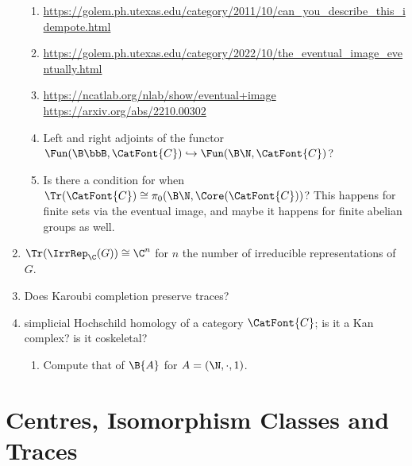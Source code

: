 \begin{enumerate}
\begin{enumerate}
            \item \url{https://golem.ph.utexas.edu/category/2011/10/can_you_describe_this_idempote.html}
            \item \url{https://golem.ph.utexas.edu/category/2022/10/the_eventual_image_eventually.html}
            \item \url{https://ncatlab.org/nlab/show/eventual+image}
                \url{https://arxiv.org/abs/2210.00302}
            \item Left and right adjoints of the functor $\Fun(\B\bbB,\CatFont{C})\hookrightarrow\Fun(\B\N,\CatFont{C})$?
            \item Is there a condition for when $\Tr(\CatFont{C})\cong\pi_{0}(\B\N,\Core(\CatFont{C}))$? This happens for finite sets via the eventual image, and maybe it happens for finite abelian groups as well.
        \end{enumerate}
    \item $\Tr(\IrrRep_{\C}(G))\cong\C^{n}$ for $n$ the number of irreducible representations of $G$.
    \item Does Karoubi completion preserve traces?
    \item simplicial Hochschild homology of a category $\CatFont{C}$; is it a Kan complex? is it coskeletal?
        \begin{enumerate}
            \item Compute that of $\B{A}$ for $A=(\N,\cdot,1)$.
        \end{enumerate}
\end{enumerate}

\ChapterTableOfContents

\section{Centres, Isomorphism Classes and Traces}\label{section-centres-isomorphism-classes-and-traces}
